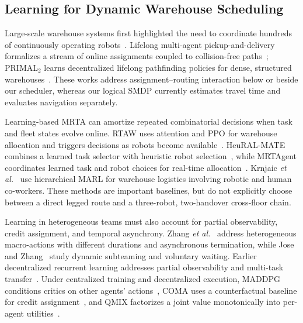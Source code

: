 \documentclass[journal]{IEEEtran}
\begin{document}
\subsection{Learning for Dynamic Warehouse Scheduling}

Large-scale warehouse systems first highlighted the need to coordinate hundreds of continuously operating robots~\cite{wurman2007warehouse}. Lifelong multi-agent pickup-and-delivery formalizes a stream of online assignments coupled to collision-free paths~\cite{ma2017lifelong}; PRIMAL$_2$ learns decentralized lifelong pathfinding policies for dense, structured warehouses~\cite{damani2021primal2}. These works address assignment--routing interaction below or beside our scheduler, whereas our logical SMDP currently estimates travel time and evaluates navigation separately.

Learning-based MRTA can amortize repeated combinatorial decisions when task and fleet states evolve online. RTAW uses attention and PPO for warehouse allocation and triggers decisions as robots become available~\cite{agrawal2023rtaw}. HeuRAL-MATE combines a learned task selector with heuristic robot selection~\cite{pal2024heuristic}, while MRTAgent coordinates learned task and robot choices for real-time allocation~\cite{pal2025together}. Krnjaic \emph{et al.}~\cite{krnjaic2024scalable} use hierarchical MARL for warehouse logistics involving robotic and human co-workers. These methods are important baselines, but do not explicitly choose between a direct legged route and a three-robot, two-handover cross-floor chain.

Learning in heterogeneous teams must also account for partial observability, credit assignment, and temporal asynchrony. Zhang \emph{et al.}~\cite{zhang2024asynchronous} address heterogeneous macro-actions with different durations and asynchronous termination, while Jose and Zhang~\cite{jose2024learning} study dynamic subteaming and voluntary waiting. Earlier decentralized recurrent learning addresses partial observability and multi-task transfer~\cite{omidshafiei2017multitask}. Under centralized training and decentralized execution, MADDPG conditions critics on other agents' actions~\cite{lowe2017maddpg}, COMA uses a counterfactual baseline for credit assignment~\cite{foerster2018coma}, and QMIX factorizes a joint value monotonically into per-agent utilities~\cite{rashid2018qmix}.
\end{document}
